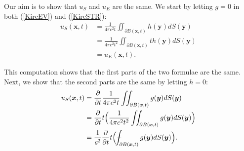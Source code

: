 \documentclass[a4paper, 12pt]{article}
\def\Xint#1{\mathchoice
{\XXint\displaystyle\textstyle{#1}}%
{\XXint\textstyle\scriptstyle{#1}}%
{\XXint\scriptstyle\scriptscriptstyle{#1}}%
{\XXint\scriptscriptstyle\scriptscriptstyle{#1}}%
\!\int}
\def\XXint#1#2#3{{\setbox0=\hbox{$#1{#2#3}{\int}$ }
\vcenter{\hbox{$#2#3$ }}\kern-.6\wd0}}
\def\dashint{\Xint-}
\numberwithin{equation}{section}
\begin{document}
Our aim is to show that $u_S$ and $u_E$ are the same. We start by letting $g=0$
in both (\ref{KircEV}) and (\ref{KircSTR}):
\begin{equation} \label{g=0}
    \begin{aligned}
        u_S(\boldsymbol{x}, t)&=\frac{1}{4\pi c^2 t}\iint_{\partial B(\boldsymbol{x}, t)}h(\boldsymbol{y})dS(\boldsymbol{y})\\
        &=\frac{1}{4\pi c^2 t^2}\iint_{\partial B(\boldsymbol{x}, t)}th(\boldsymbol{y})dS(\boldsymbol{y})\\
        &=u_E(\boldsymbol{x}, t).
    \end{aligned}
\end{equation}

This computation shows that the first parts of the two formulae are the same.
Next, we show that the second parts are the same by letting $h=0$:
\begin{equation} \label{starr}
    \begin{aligned}
        u_S(\boldsymbol{x},t)&=\diffp[1]{}{t}\frac{1}{4\pi c^2 t}\iint_{\partial B(\boldsymbol{x}, t)}g(\boldsymbol{y})dS(\boldsymbol{y})\\
        &=\diffp[1]{}{t}t\Big(\frac{1}{4\pi c^2 t^2}\iint_{\partial B(\boldsymbol{x}, t)}g(\boldsymbol{y})dS(\boldsymbol{y})\Big)\\
        &=\frac{1}{c^2}\diffp[1]{}{t}t\Big(\dashint_{\partial B(\boldsymbol{x}, t)}g(\boldsymbol{y})dS(\boldsymbol{y})\Big).
    \end{aligned}
\end{equation}
\end{document}
